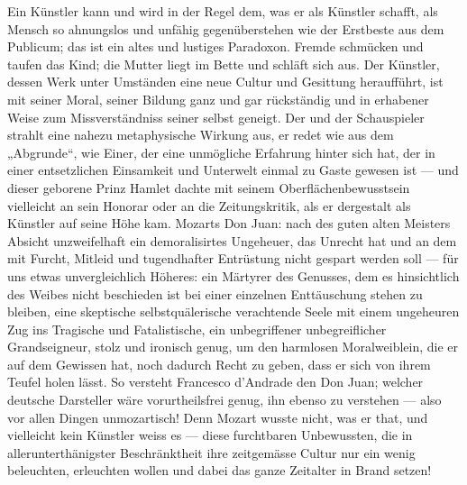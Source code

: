 Ein Künstler kann und wird in der Regel dem, was er als Künstler schafft, als Mensch so ahnungslos und unfähig gegenüberstehen wie der Erstbeste aus dem Publicum; das ist ein altes und lustiges Paradoxon. Fremde schmücken und taufen das Kind; die Mutter liegt im Bette und schläft sich aus. Der Künstler, dessen Werk unter Umständen eine neue Cultur und Gesittung heraufführt, ist mit seiner Moral, seiner Bildung ganz und gar rückständig und in erhabener Weise zum Missverständniss seiner selbst geneigt. Der und der Schauspieler strahlt eine nahezu metaphysische Wirkung aus, er redet wie aus dem „Abgrunde“, wie Einer, der eine unmögliche Erfahrung hinter sich hat, der in einer entsetzlichen Einsamkeit und Unterwelt einmal zu Gaste gewesen ist — und dieser geborene Prinz Hamlet dachte mit seinem Oberflächenbewusstsein vielleicht an sein Honorar oder an die Zeitungskritik, als er dergestalt als Künstler auf seine Höhe kam. Mozarts Don Juan: nach des guten alten Meisters Absicht unzweifelhaft ein demoralisirtes Ungeheuer, das  Unrecht hat und an dem mit Furcht, Mitleid und tugendhafter Entrüstung nicht gespart werden soll — für uns etwas unvergleichlich Höheres: ein Märtyrer des Genusses, dem es hinsichtlich des Weibes nicht beschieden ist bei einer einzelnen Enttäuschung stehen zu bleiben, eine skeptische selbstquälerische verachtende Seele mit einem ungeheuren Zug ins Tragische und Fatalistische, ein unbegriffener unbegreiflicher Grandseigneur, stolz und ironisch genug, um den harmlosen Moralweiblein, die er auf dem Gewissen hat, noch dadurch Recht zu geben, dass er sich von ihrem Teufel holen lässt. So versteht Francesco d’Andrade den Don Juan; welcher deutsche Darsteller wäre vorurtheilsfrei genug, ihn ebenso zu verstehen — also vor allen Dingen unmozartisch! Denn Mozart wusste nicht, was er that, und vielleicht kein Künstler weiss es — diese furchtbaren Unbewussten, die in allerunterthänigster Beschränktheit ihre zeitgemässe Cultur nur ein wenig beleuchten, erleuchten wollen und dabei das ganze Zeitalter in Brand setzen!
\par

